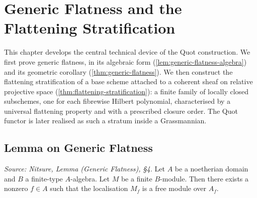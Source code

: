 \chapter{Generic Flatness and the Flattening Stratification}
\label{chap:flattening}

This chapter develops the central technical device of the Quot construction. We
first prove generic flatness, in its algebraic form
(\cref{lem:generic-flatness-algebra}) and its geometric corollary
(\cref{thm:generic-flatness}). We then construct the flattening stratification of
a base scheme attached to a coherent sheaf on relative projective space
(\cref{thm:flattening-stratification}): a finite family of locally closed
subschemes, one for each fibrewise Hilbert polynomial, characterised by a
universal flattening property and with a prescribed closure order. The Quot
functor is later realised as such a stratum inside a Grassmannian.

\bigskip
\section*{Lemma on Generic Flatness}
\medskip

\begin{lemma}
  \label{lem:generic-flatness-algebra}
  \textit{Source: Nitsure, Lemma (Generic Flatness), §4.}
  Let \(A\) be a noetherian domain and \(B\) a finite-type \(A\)-algebra. Let
  \(M\) be a finite \(B\)-module. Then there exists a nonzero \(f\in A\) such that
  the localisation \(M_f\) is a free module over \(A_f\).
\end{lemma}


